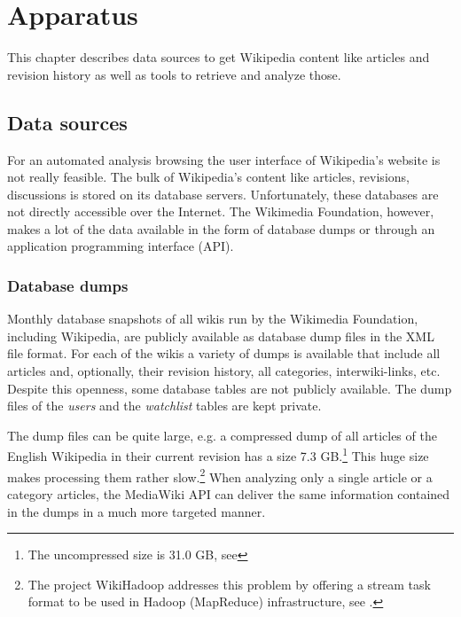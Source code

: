\chapter{Apparatus}\label{ch:apparatus}

This chapter describes data sources to get Wikipedia content like articles and revision history as well as tools to retrieve and analyze those.

\section{Data sources}

For an automated analysis browsing the user interface of Wikipedia's website is not really feasible.
The bulk of Wikipedia's content like articles, revisions, discussions is stored on its database servers.
Unfortunately, these databases are not directly accessible over the Internet.
The Wikimedia Foundation, however, makes a lot of the data available in the form of database dumps or through an application programming interface (API).

\subsection{Database dumps}

Monthly database snapshots of all wikis run by the Wikimedia Foundation, including Wikipedia,  are publicly available as database dump files in the XML file format.
For each of the wikis a variety of dumps is available that include all articles and, optionally, their revision history, all categories, interwiki-links, etc.
Despite this openness, some database tables are not publicly available.
The dump files of the \emph{users} and the \emph{watchlist} tables are kept private.

The dump files can be quite large, e.g. a compressed dump of all articles of the English Wikipedia in their current revision has a size 7.3 GB.\footnote{The uncompressed size is 31.0 GB, see }
This huge size makes processing them rather slow.\footnote{The project WikiHadoop addresses this problem by offering a stream task format to be used in Hadoop (MapReduce) infrastructure, see .}
When analyzing only a single article or a category articles, the MediaWiki API can deliver the same information contained in the dumps in a much more targeted manner. 

